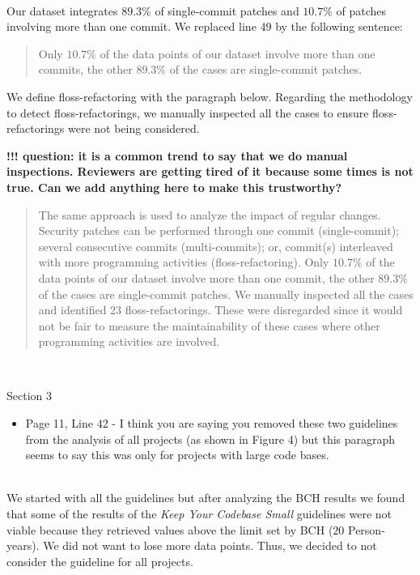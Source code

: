 \documentclass[11pt,fleqn]{article}
\newcommand{\eline}{\vspace*{.75\baselineskip}}
\newcommand{\Referee}[1]{\eline \noindent {\bf Reviewer comment #1:} \\}
\newcommand{\Us}{\eline \noindent {\bf Response:}\\}
\newenvironment{revcomment}[1][]
{\Referee{#1}\begin{rcomment}}
{\end{rcomment}}
\begin{document}
\Us Our dataset integrates $89.3\%$ of single-commit patches and 
$10.7\%$ of patches involving more than one commit. We replaced 
line 49 by the following sentence:

\begin{quote}
    Only $10.7\%$ of the data points 
of our dataset involve more than one commits, the other
$89.3\%$ of the cases are single-commit patches.
\end{quote}

We define floss-refactoring with the paragraph below. 
Regarding the methodology to detect floss-refactorings, 
we manually inspected all the cases to ensure 
floss-refactorings were not being considered.


\textbf{!!! question: it is a common trend to say that we do manual inspections. Reviewers are getting tired of it because some times is not true. Can we add anything here to make this trustworthy?}

\begin{quote}
    The same approach is used to analyze the impact of regular 
    changes. Security patches can be performed through one commit (single-commit); 
    several consecutive commits (multi-commits); or, commit(s) interleaved with more 
    programming activities (floss-refactoring). Only $10.7\%$ of the data points 
    of our dataset involve more than one commit, the other
    $89.3\%$ of the cases are single-commit patches. We manually 
    inspected all the cases and identified $23$ floss-refactorings. 
    These were disregarded since it would not be fair to measure the 
    maintainability of these cases where other programming activities 
    are involved.
\end{quote}


\begin{revcomment}[2.14]
    Section 3\\
    \begin{itemize}
        \item Page 11, Line 42 - I think you are saying you removed these two guidelines 
        from the analysis of all projects (as shown in Figure 4) but this paragraph seems 
        to say this was only for projects with large code bases.
    \end{itemize}
\end{revcomment}

\Us We started with all the guidelines but after analyzing the BCH results 
we found that some of the results of the \emph{Keep Your Codebase Small} guidelines were not viable
because they retrieved values above the limit set by BCH ($20$ Person-years). We did not want 
to lose more data points. Thus, we decided to not consider the guideline for all projects.
\end{document}
